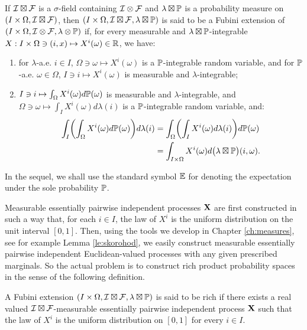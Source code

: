 \begin{definition}
	\label{de:Fubini_extension}
	If ${\cal I}\boxtimes{\cal F}$ is a $\sigma$-field containing ${\cal I}\otimes{\cal F}$
	and $\lambda\boxtimes\mathbb{P}$ is a probability measure on 
	$(I\times\Omega,{\cal I}\boxtimes{\cal F})$, then $(I\times\Omega,{\cal I}\boxtimes{\cal F},\lambda\boxtimes\mathbb{P})$ is said to be a Fubini extension of $(I\times\Omega,{\cal I}\otimes{\cal F},\lambda\otimes\mathbb{P})$ if, for every measurable and $\lambda\boxtimes\mathbb{P}$-integrable 
	$X:I\times\Omega\ni(i,x)\mapsto X^i(\omega)\in\mathbb{R}$, we have:
	\begin{enumerate}
		\itemsep=2pt
		\item for $\lambda$-a.e. $i\in I$, $\Omega \ni \omega \mapsto 
		X^i(\omega)$ is a $\mathbb{P}$-integrable random variable, and for $\mathbb{P}$-a.e. $\omega\in \Omega$, $I \ni i \mapsto X^i (\omega)$ is measurable and $\lambda$-integrable;
		\item $I\ni i\mapsto\int_\Omega X^i(\omega)d\mathbb{P}(\omega)$ is measurable and $\lambda$-integrable, and $\Omega\ni \omega\mapsto\int_I X^i(\omega)d\lambda(i)$ is a $\mathbb{P}$-integrable random variable, and:
		\begin{equation}
		\label{fo:Fubini}
		\begin{split}
		\int_I\biggl(\int_\Omega X^i(\omega)d\mathbb{P}(\omega)\biggr)d\lambda(i)&=\int_\Omega\biggl(\int_IX^i(\omega)d\lambda(i)\biggr)d\mathbb{P}(\omega)
		\\
		&=\int_{I\times\Omega} X^i(\omega)d \bigl( \lambda\boxtimes \mathbb{P}\bigr) (i,\omega).
		\end{split}
		\end{equation} 
	\end{enumerate}
\end{definition}

In the sequel, we shall use the standard symbol $\mathbb{E}$ for denoting the expectation under the sole probability $\mathbb{P}$. 
\vskip 4pt


Measurable essentially pairwise independent processes
$\mathbf{X}$ are first constructed in such a way that, for each $i\in I$, the law of $X^i$ is the uniform distribution on the unit interval $[0,1]$.
Then, using the tools we develop in Chapter \ref{ch:measures}, see for example Lemma \ref{le:skorohod},  we easily construct  measurable essentially pairwise independent Euclidean-valued processes with any given prescribed marginals. So the actual problem is to construct rich product probability spaces in the sense of the following definition.

\begin{definition}
	\label{de:rich}
	A Fubini extension $(I\times\Omega,{\cal I}\boxtimes{\cal F},\lambda\boxtimes\mathbb{P})$  is said to be rich 
	if there exists a real valued ${\cal I}\boxtimes{\cal F}$-measurable essentially pairwise independent process $\mathbf{X}$ such that the law of $X^i$ is the uniform distribution on $[0,1]$ for every $i\in I$.
\end{definition} 

